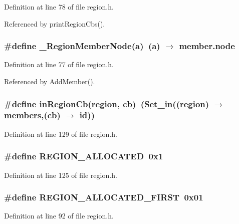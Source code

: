 Definition at line 78 of file region.h.

Referenced by print\-Region\-Cbs().
\subsubsection{\setlength{\rightskip}{0pt plus 5cm}\#define \_\-Region\-Member\-Node(a)~(a) $\rightarrow$ \bf{member.node}}\label{region_8h_6d0df3af850d5317e75afe228297c267}




Definition at line 77 of file region.h.

Referenced by Add\-Member().
\subsubsection{\setlength{\rightskip}{0pt plus 5cm}\#define in\-Region\-Cb(\bf{region}, cb)~(\bf{Set\_\-in}((\bf{region}) $\rightarrow$ members,(cb) $\rightarrow$ id))}\label{region_8h_ec2a2dffaadecc56c375bb5bf1f3822f}




Definition at line 129 of file region.h.
\subsubsection{\setlength{\rightskip}{0pt plus 5cm}\#define REGION\_\-ALLOCATED~0x1}\label{region_8h_9e507bdc4ea343555f1da188f30dfc12}




Definition at line 125 of file region.h.
\subsubsection{\setlength{\rightskip}{0pt plus 5cm}\#define REGION\_\-ALLOCATED\_\-FIRST~0x01}\label{region_8h_437a6ff8b98c89a303748bef98c3518b}




Definition at line 92 of file region.h.

